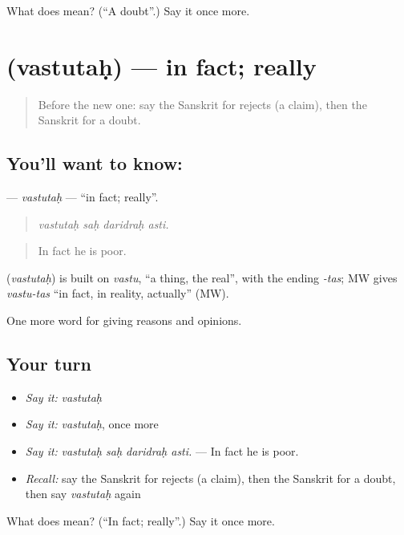 \begin{tcolorbox}[breakable,colback=teal!4,colframe=teal!35!black,title={Before you move on}]
What does  mean? (\textquotedblleft{}A doubt\textquotedblright{}.) Say it once more.
\end{tcolorbox}
\section[\texorpdfstring{\sk{वस्तुतः} (vastutaḥ)}{वस्तुतः (vastutaḥ)}]{ (vastutaḥ) — in fact; really}

\label{lesson:SA-C346-vastutah}



\begin{quote}
Before the new one: say the Sanskrit for rejects (a claim), then the Sanskrit for a doubt.
\end{quote}

\subsection*{You'll want to know: }
\textbf{} — \emph{vastutaḥ} — \textquotedblleft{}in fact; really\textquotedblright{}.

\begin{quote}
   
\end{quote}

\begin{quote}
\emph{vastutaḥ saḥ daridraḥ asti.}
\end{quote}

\begin{quote}
In fact he is poor.
\end{quote}

\begin{cousinweb}
\textbf{} (\emph{vastutaḥ}) is built on \emph{vastu}, \textquotedblleft{}a thing, the real\textquotedblright{}, with the ending \emph{-tas}; MW gives \emph{vastu-tas} \textquotedblleft{}in fact, in reality, actually\textquotedblright{} (MW).
\end{cousinweb}

\begin{grammarlens}[title={What you've built}]
One more word for giving reasons and opinions.
\end{grammarlens}

\subsection*{Your turn}
\begin{itemize}
\raggedright
  \item \emph{Say it:} \emph{vastutaḥ}
  \item \emph{Say it:} \emph{vastutaḥ}, once more
  \item \emph{Say it:} \emph{vastutaḥ saḥ daridraḥ asti.} — In fact he is poor.
  \item \emph{Recall:} say the Sanskrit for rejects (a claim), then the Sanskrit for a doubt, then say \emph{vastutaḥ} again
\end{itemize}

\begin{tcolorbox}[breakable,colback=teal!4,colframe=teal!35!black,title={Before you move on}]
What does  mean? (\textquotedblleft{}In fact; really\textquotedblright{}.) Say it once more.
\end{tcolorbox}
